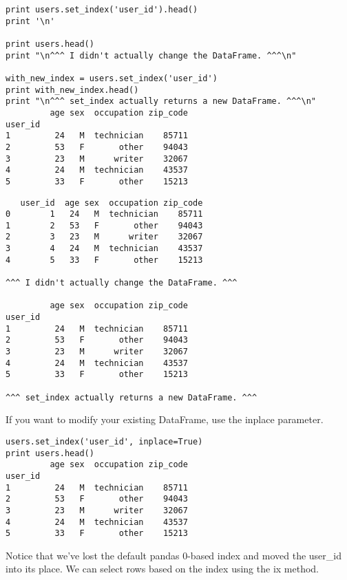 \documentclass[]{article}
\begin{document}
\begin{framed}
\begin{verbatim}
print users.set_index('user_id').head()
print '\n'

print users.head()
print "\n^^^ I didn't actually change the DataFrame. ^^^\n"

with_new_index = users.set_index('user_id')
print with_new_index.head()
print "\n^^^ set_index actually returns a new DataFrame. ^^^\n"
         age sex  occupation zip_code
user_id                              
1         24   M  technician    85711
2         53   F       other    94043
3         23   M      writer    32067
4         24   M  technician    43537
5         33   F       other    15213

\end{verbatim}
\end{framed}
\begin{framed}
 \begin{verbatim}
   user_id  age sex  occupation zip_code
0        1   24   M  technician    85711
1        2   53   F       other    94043
2        3   23   M      writer    32067
3        4   24   M  technician    43537
4        5   33   F       other    15213

^^^ I didn't actually change the DataFrame. ^^^

         age sex  occupation zip_code
user_id                              
1         24   M  technician    85711
2         53   F       other    94043
3         23   M      writer    32067
4         24   M  technician    43537
5         33   F       other    15213

^^^ set_index actually returns a new DataFrame. ^^^

\end{verbatim}
\end{framed}
If you want to modify your existing DataFrame, use the inplace parameter.


\begin{framed}
\begin{verbatim}
users.set_index('user_id', inplace=True)
print users.head()
         age sex  occupation zip_code
user_id                              
1         24   M  technician    85711
2         53   F       other    94043
3         23   M      writer    32067
4         24   M  technician    43537
5         33   F       other    15213
\end{verbatim}
\end{framed}

Notice that we've lost the default pandas 0-based index and moved the user\_id into its place. We can select rows based on the index using the ix method.
\end{document}
